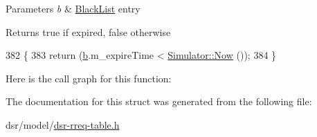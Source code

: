 \begin{DoxyParams}{Parameters}
{\em b} & \hyperlink{structns3_1_1dsr_1_1BlackList}{Black\+List} entry \\
\hline
\end{DoxyParams}
\begin{DoxyReturn}{Returns}
true if expired, false otherwise 
\end{DoxyReturn}

\begin{DoxyCode}
382     \{
383       \textcolor{keywordflow}{return} (\hyperlink{buildings__pathloss_8m_a21ad0bd836b90d08f4cf640b4c298e7c}{b}.m\_expireTime < \hyperlink{classns3_1_1Simulator_ac3178fa975b419f7875e7105be122800}{Simulator::Now} ());
384     \}
\end{DoxyCode}


Here is the call graph for this function\+:




The documentation for this struct was generated from the following file\+:\begin{DoxyCompactItemize}
\item 
dsr/model/\hyperlink{dsr-rreq-table_8h}{dsr-\/rreq-\/table.\+h}\end{DoxyCompactItemize}
